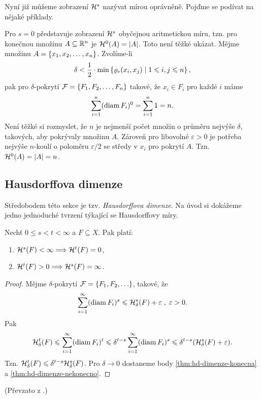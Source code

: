 Nyní již můžeme zobrazení $\mathcal{H}^s$ nazývat mírou oprávněně. Pojďme se podívat na nějaké příklady.
\begin{example}
    Pro $s=0$ představuje zobrazení $\mathcal{H}^s$ obyčejnou aritmetickou míru, tzn. pro konečnou množinu $A\subseteq\mathbb{R}^n$ je $\mathcal{H}^0(A)=|A|$. Toto není těžké ukázat. Mějme množinu $A=\left\{x_1,x_2,\ldots,x_n\right\}$. Zvolíme-li
    \[\delta<\dfrac{1}{2}\cdot\min\left\{\varrho_e(x_i,x_j)\mid 1\leqslant i,j\leqslant n\right\},\]
    pak pro $\delta$-pokrytí $\mathcal{F}=\left\{F_1,F_2,\ldots,F_n\right\}$ takové, že $x_i\in F_i$ pro každé $i$ máme
    \[\sum_{i=1}^{n}(\operatorname{diam}{F_i})^0=\sum_{i=1}^{n}1=n.\]
    Není těžké si rozmyslet, že $n$ je nejmenší počet množin o průměru nejvýše $\delta$, takových, aby pokrývaly množinu $A$. Zároveň pro libovolné $\varepsilon>0$ je potřeba nejvýše $n$-koulí o poloměru $\varepsilon/2$ se středy v $x_i$ pro pokrytí $A$. Tzn. $\mathcal{H}^0(A)=|A|=n$.
\end{example}

\subsection{Hausdorffova dimenze}\label{subsec:hausdorffova-dimenze}

Středobodem této sekce je tzv. \emph{Hausdorffova dimenze}. Na úvod si dokážeme jedno jednoduché tvrzení týkající se Hausdorffovy míry.
\begin{theorem}\label{thm:hodnoty-hausdorffovy-miry}
    Nechť $0\leqslant s<t<\infty$ a $F\subseteq X$. Pak platí:
    \begin{enumerate}[label=(\roman*)]
        \item\label{thm:hd-dimenze-konecna} $\mathcal{H}^s(F)<\infty\Longrightarrow\mathcal{H}^t(F)=0$,
        \item\label{thm:hd-dimenze-nekonecno} $\mathcal{H}^t(F)>0\Longrightarrow\mathcal{H}^s(F)=\infty$.
    \end{enumerate}
\end{theorem}
\begin{proof}
    Mějme $\delta$-pokrytí $\mathcal{F}=\left\{F_1,F_2,\ldots\right\}$, takové, že
    \[\sum_{i=1}^{\infty}(\operatorname{diam}{F_i})^s\leqslant\mathcal{H}_{\delta}^{s}(F)+\varepsilon\;,\;\varepsilon>0.\]
    Pak
    \[\mathcal{H}_{\delta}^{t}(F)\leqslant\sum_{i=1}^{\infty}(\operatorname{diam}{F_i})^t\leqslant\delta^{t-s}\sum_{i=1}^{\infty}(\operatorname{diam}{F_i})^s\leqslant\delta^{t-s}(\mathcal{H}_{\delta}^{s}(F)+\varepsilon).\]
    Tzn. $\mathcal{H}_{\delta}^{t}(F)\leqslant\delta^{t-s}\mathcal{H}_{\delta}^{s}(F)$. Pro $\delta\to 0$ dostaneme body \ref{thm:hd-dimenze-konecna} a \ref{thm:hd-dimenze-nekonecno}.
\end{proof}
(Převzato z \citep[str. 68]{Mattila1995}.)

